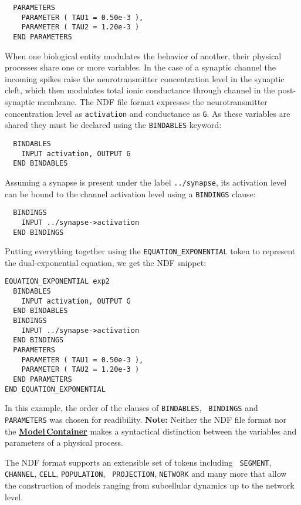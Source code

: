 \documentclass[12pt]{article}
\begin{document}
\begin{verbatim}
  PARAMETERS
    PARAMETER ( TAU1 = 0.50e-3 ),
    PARAMETER ( TAU2 = 1.20e-3 )
  END PARAMETERS
\end{verbatim}

When one biological entity modulates the behavior of another,
their physical processes share one or more variables.  In the case of
a synaptic channel the incoming spikes raise the neurotransmitter
concentration level in the synaptic cleft, which then modulates total
ionic conductance through channel in the post-synaptic membrane.  The NDF file format expresses the
neurotransmitter concentration level as {\tt activation} and
conductance as {\tt G}.  As these variables  are shared they must be declared using
the {\tt BINDABLES} keyword:
\begin{verbatim}
  BINDABLES
    INPUT activation, OUTPUT G
  END BINDABLES
\end{verbatim}
Assuming a synapse is present under the label {\tt ../synapse}, its
activation level can be bound to the channel activation level using a
{\tt BINDINGS} clause:
\begin{verbatim}
  BINDINGS
    INPUT ../synapse->activation
  END BINDINGS
\end{verbatim}

Putting everything together using the {\tt EQUATION\_EXPONENTIAL}
token to represent the dual-exponential equation, we get the NDF
snippet:
\begin{verbatim}
EQUATION_EXPONENTIAL exp2
  BINDABLES
    INPUT activation, OUTPUT G
  END BINDABLES
  BINDINGS
    INPUT ../synapse->activation
  END BINDINGS
  PARAMETERS
    PARAMETER ( TAU1 = 0.50e-3 ),
    PARAMETER ( TAU2 = 1.20e-3 )
  END PARAMETERS
END EQUATION_EXPONENTIAL
\end{verbatim}

In this example, the order of the clauses of {\tt BINDABLES}, {\tt
  BINDINGS} and {\tt PARAMETERS} was chosen for readibility.  
{\bf Note:} Neither the NDF file format nor
the \href{../model-container/model-container.tex}{\bf Model\,Container}
makes a syntactical distinction between the variables and parameters of a
physical process.

The NDF format supports an extensible set of tokens including {\tt
  SEGMENT}, {\tt CHANNEL}, {\tt CELL}, {\tt POPULATION}, {\tt
  PROJECTION}, {\tt NETWORK} and many more that allow the construction of
models ranging from subcellular dynamics up to the network level.
\end{document}

